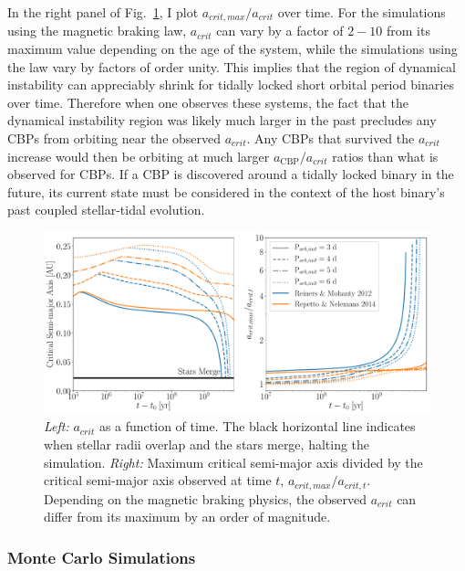 In the right panel of Fig.~\ref{STEEP:fig:obs_acrit}, I plot $a_{crit,max}/a_{crit}$ over time.  For the simulations using the \citet{Reiners2012} magnetic braking law, $a_{crit}$ can vary by a factor of $2-10$ from its maximum value depending on the age of the system, while the simulations using the \citet{Repetto2014} law vary by factors of order unity.  This implies that the region of dynamical instability can appreciably shrink for tidally locked short orbital period binaries over time.  Therefore when one observes these systems, the fact that the dynamical instability region was likely much larger in the past precludes any CBPs from orbiting near the observed $a_{crit}$.  Any CBPs that survived the $a_{crit}$ increase would then be orbiting at much larger $a_{\text{CBP}}/a_{crit}$ ratios than what is observed for \kepler CBPs.  If a CBP is discovered around a tidally locked binary in the future, its current state must be considered in the context of the host binary's past coupled stellar-tidal evolution.

\begin{figure}
	\includegraphics[width=\columnwidth]{obs_acrit.pdf}
   \caption{{\it Left:} $a_{crit}$ as a function of time.  The black horizontal line indicates when stellar radii overlap and the stars merge, halting the simulation. {\it Right:} Maximum critical semi-major axis divided by the critical semi-major axis observed at time $t$, $a_{crit,max}/a_{crit,t}$.  Depending on the magnetic braking physics, the observed $a_{crit}$ can differ from its maximum by an order of magnitude.}
    \label{STEEP:fig:obs_acrit}
\end{figure}

\subsubsection{Monte Carlo Simulations}

